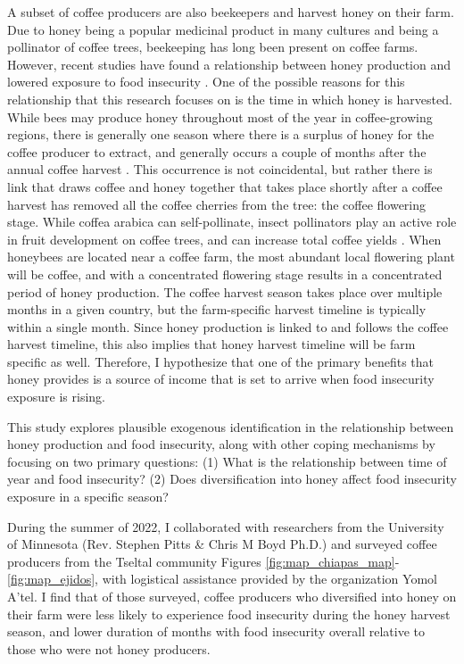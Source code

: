 \documentclass[../main.tex]{subfiles}
\begin{document}
A subset of coffee producers are also beekeepers and harvest honey on their farm. Due to honey being a popular medicinal product in many cultures and being a pollinator of coffee trees, beekeeping has long been present on coffee farms. However, recent studies have found a relationship between honey production and lowered exposure to food insecurity \parencite{anderzen_effects_2020}. One of the possible reasons for this relationship that this research focuses on is the time in which honey is harvested. While bees may produce honey throughout most of the year in coffee-growing regions, there is generally one season where there is a surplus of honey for the coffee producer to extract, and generally occurs a couple of months after the annual coffee harvest \parencite{martello_use_2022}. This occurrence is not coincidental, but rather there is link that draws coffee and honey together that takes place shortly after a coffee harvest has removed all the coffee cherries from the tree: the coffee flowering stage. While coffea arabica can self-pollinate, insect pollinators play an active role in fruit development on coffee trees, and can increase total coffee yields \parencite{hipolito_landscape_2018, khan_honey_2007}. When honeybees are located near a coffee farm, the most abundant local flowering plant will be coffee, and with a concentrated flowering stage results in a concentrated period of honey production. The coffee harvest season takes place over multiple months in a given country, but the farm-specific harvest timeline is typically within a single month. Since honey production is linked to and follows the coffee harvest timeline, this also implies that honey harvest timeline will be farm specific as well. Therefore, I hypothesize that one of the primary benefits that honey provides is a source of income that is set to arrive when food insecurity exposure is rising. 

This study explores plausible exogenous identification in the relationship between honey production and food insecurity, along with other coping mechanisms by focusing on two primary questions: (1) What is the relationship between time of year and food insecurity? (2) Does diversification into honey affect food insecurity exposure in a specific season?

During the summer of 2022, I collaborated with researchers from the University of Minnesota (Rev. Stephen Pitts \& Chris M Boyd Ph.D.) and surveyed coffee producers from the Tseltal community Figures \ref{fig:map_chiapas_map}-\ref{fig:map_ejidos}, with logistical assistance provided by the organization Yomol A’tel. I find that of those surveyed, coffee producers who diversified into honey on their farm were less likely to experience food insecurity during the honey harvest season, and lower duration of months with food insecurity overall relative to those who were not honey producers.
\end{document}
